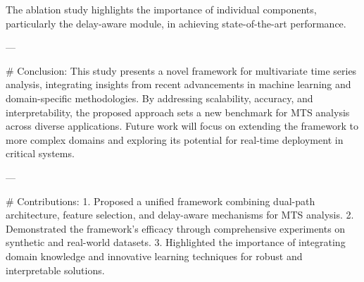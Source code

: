 The ablation study highlights the importance of individual components, particularly the delay-aware module, in achieving state-of-the-art performance.

---

# Conclusion:
This study presents a novel framework for multivariate time series analysis, integrating insights from recent advancements in machine learning and domain-specific methodologies. By addressing scalability, accuracy, and interpretability, the proposed approach sets a new benchmark for MTS analysis across diverse applications. Future work will focus on extending the framework to more complex domains and exploring its potential for real-time deployment in critical systems.

---

# Contributions:
1. Proposed a unified framework combining dual-path architecture, feature selection, and delay-aware mechanisms for MTS analysis.
2. Demonstrated the framework's efficacy through comprehensive experiments on synthetic and real-world datasets.
3. Highlighted the importance of integrating domain knowledge and innovative learning techniques for robust and interpretable solutions.